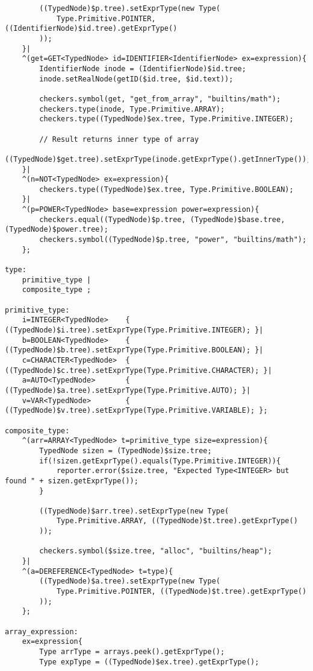 \begin{landscape}
\begin{lstlisting}
        ((TypedNode)$p.tree).setExprType(new Type(
            Type.Primitive.POINTER, ((IdentifierNode)$id.tree).getExprType()
        ));
    }|
    ^(get=GET<TypedNode> id=IDENTIFIER<IdentifierNode> ex=expression){
        IdentifierNode inode = (IdentifierNode)$id.tree;
        inode.setRealNode(getID($id.tree, $id.text));

        checkers.symbol(get, "get_from_array", "builtins/math");
        checkers.type(inode, Type.Primitive.ARRAY);
        checkers.type((TypedNode)$ex.tree, Type.Primitive.INTEGER);

        // Result returns inner type of array
        ((TypedNode)$get.tree).setExprType(inode.getExprType().getInnerType());
    }|
    ^(n=NOT<TypedNode> ex=expression){
        checkers.type((TypedNode)$ex.tree, Type.Primitive.BOOLEAN);
    }|
    ^(p=POWER<TypedNode> base=expression power=expression){
        checkers.equal((TypedNode)$p.tree, (TypedNode)$base.tree, (TypedNode)$power.tree);
        checkers.symbol((TypedNode)$p.tree, "power", "builtins/math");
    };

type:
    primitive_type |
    composite_type ;

primitive_type:
    i=INTEGER<TypedNode>    { ((TypedNode)$i.tree).setExprType(Type.Primitive.INTEGER); }|
    b=BOOLEAN<TypedNode>    { ((TypedNode)$b.tree).setExprType(Type.Primitive.BOOLEAN); }|
    c=CHARACTER<TypedNode>  { ((TypedNode)$c.tree).setExprType(Type.Primitive.CHARACTER); }|
    a=AUTO<TypedNode>       { ((TypedNode)$a.tree).setExprType(Type.Primitive.AUTO); }|
    v=VAR<TypedNode>        { ((TypedNode)$v.tree).setExprType(Type.Primitive.VARIABLE); };

composite_type:
    ^(arr=ARRAY<TypedNode> t=primitive_type size=expression){
        TypedNode sizen = (TypedNode)$size.tree;
        if(!sizen.getExprType().equals(Type.Primitive.INTEGER)){
            reporter.error($size.tree, "Expected Type<INTEGER> but found " + sizen.getExprType());
        }

        ((TypedNode)$arr.tree).setExprType(new Type(
            Type.Primitive.ARRAY, ((TypedNode)$t.tree).getExprType()
        ));

        checkers.symbol($size.tree, "alloc", "builtins/heap");
    }|
    ^(a=DEREFERENCE<TypedNode> t=type){
        ((TypedNode)$a.tree).setExprType(new Type(
            Type.Primitive.POINTER, ((TypedNode)$t.tree).getExprType()
        ));
    };

array_expression:
    ex=expression{
        Type arrType = arrays.peek().getExprType();
        Type expType = ((TypedNode)$ex.tree).getExprType();


\end{lstlisting}
\end{landscape}
